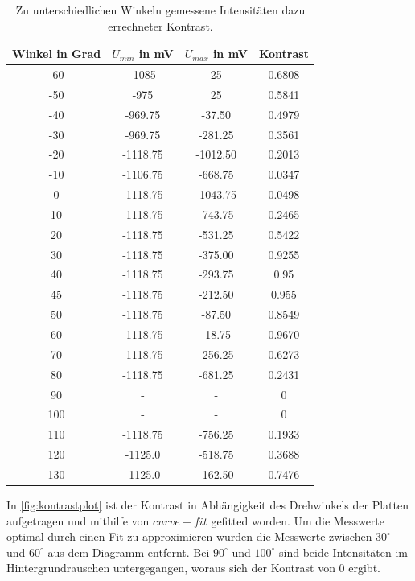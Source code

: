 \begin{table}[H]
  \center
  \caption{Zu unterschiedlichen Winkeln gemessene Intensitäten dazu errechneter Kontrast.}
  \label{tab:Kontrast}
\begin{tabular}{c|c|c|c}
  Winkel in Grad& $U_{min}$ in mV& $U_{max}$ in mV& Kontrast\\
  \hline
  -60 &    -1085&       25& 0.6808\\
  -50 &     -975&       25& 0.5841\\
  -40 &  -969.75&   -37.50& 0.4979\\
  -30 &  -969.75&  -281.25& 0.3561\\
  -20 & -1118.75& -1012.50& 0.2013\\
  -10 & -1106.75&  -668.75& 0.0347\\
  0   & -1118.75& -1043.75& 0.0498\\
  10  & -1118.75&  -743.75& 0.2465\\
  20  & -1118.75&  -531.25& 0.5422\\
  30  & -1118.75&  -375.00& 0.9255\\
  40  & -1118.75&  -293.75& 0.95\\
  45  & -1118.75&  -212.50& 0.955\\
  50  & -1118.75&   -87.50& 0.8549\\
  \hline
  60  & -1118.75&   -18.75& 0.9670\\
  \hline
  70  & -1118.75&  -256.25& 0.6273\\
  80  & -1118.75&  -681.25& 0.2431\\
  90  &        -&        -&      0\\
  100 &        -&        -&      0\\
  110 & -1118.75&  -756.25& 0.1933\\
  120 &  -1125.0&  -518.75& 0.3688\\
  130 &  -1125.0&  -162.50& 0.7476\\
\end{tabular}
\end{table}
In \ref{fig:kontrastplot} ist der Kontrast in Abhängigkeit des Drehwinkels der Platten aufgetragen und mithilfe von $curve-fit$ gefitted worden.
Um die Messwerte optimal durch einen Fit zu approximieren wurden die Messwerte zwischen $30^\circ$ und $60^\circ$ aus dem Diagramm entfernt. Bei $90^\circ$ und $100^\circ$ sind beide Intensitäten im Hintergrundrauschen untergegangen, woraus sich der Kontrast von 0 ergibt.\\
